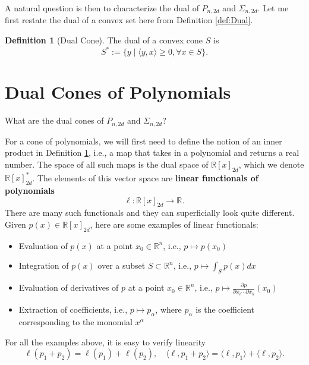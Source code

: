 \documentclass[
]{book}
\theoremstyle{definition}
\newtheorem{definition}{Definition}[chapter]
\theoremstyle{definition}
\theoremstyle{definition}
\theoremstyle{definition}
\theoremstyle{remark}
\begin{document}
A natural question is then to characterize the dual of \(P_{n,2d}\) and \(\Sigma_{n,2d}\). Let me first restate the dual of a convex set here from Definition \ref{def:Dual}.

\begin{definition}[Dual Cone]
\protect\hypertarget{def:DualConeRestate}{}\label{def:DualConeRestate}The dual of a convex cone \(S\) is
\[
S^* := \{ y \mid \langle y, x \rangle \geq 0, \forall x \in S \}.
\]
\end{definition}

\section{Dual Cones of Polynomials}\label{dual-cones-of-polynomials}

What are the dual cones of \(P_{n,2d}\) and \(\Sigma_{n,2d}\)?

For a cone of polynomials, we will first need to define the notion of an inner product in Definition \ref{def:DualConeRestate}, i.e., a map that takes in a polynomial and returns a real number. The space of all such maps is the dual space of \(\mathbb{R}[x]_{2d}\), which we denote \(\mathbb{R}[x]^*_{2d}\). The elements of this vector space are \textbf{linear functionals of polynomials}
\begin{equation}
\ell: \mathbb{R}[x]_{2d} \rightarrow \mathbb{R}^{}.
\label{eq:linear-functional-poly}
\end{equation}
There are many such functionals and they can superficially look quite different. Given \(p(x) \in \mathbb{R}[x]_{2d}\), here are some examples of linear functionals:

\begin{itemize}
\item
  Evaluation of \(p(x)\) at a point \(x_0 \in \mathbb{R}^{n}\), i.e., \(p \mapsto p(x_0)\)
\item
  Integration of \(p(x)\) over a subset \(S \subset \mathbb{R}^{n}\), i.e., \(p \mapsto \int_S p(x) dx\)
\item
  Evaluation of derivatives of \(p\) at a point \(x_0 \in \mathbb{R}^{n}\), i.e., \(p \mapsto \frac{\partial p}{\partial x_i \cdots \partial x_k} (x_0)\)
\item
  Extraction of coefficients, i.e., \(p \mapsto p_{\alpha}\), where \(p_{\alpha}\) is the coefficient corresponding to the monomial \(x^{\alpha}\)
\end{itemize}

For all the examples above, it is easy to verify linearity
\[
\ell(p_1 + p_2) = \ell(p_1) + \ell(p_2), \quad \langle \ell, p_1 + p_2 \rangle = \langle \ell, p_1 \rangle + \langle \ell, p_2 \rangle.
\]
\end{document}
